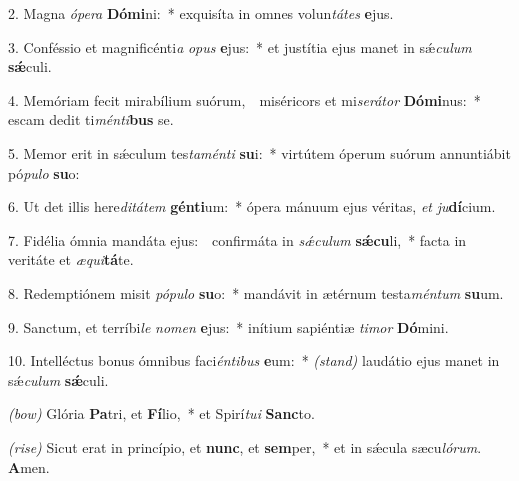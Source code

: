 2. Magna \textit{ó}\textit{pe}\textit{ra} \textbf{Dó}\textbf{mi}ni:~* 
	exquisíta in omnes volun\textit{tá}\textit{tes} \textbf{e}jus.

3. Conféssio et magnificénti\textit{a} \textit{o}\textit{pus} \textbf{e}jus:~* 
	et justítia ejus manet in sǽ\textit{cu}\textit{lum} \textbf{sǽ}culi.

4. Memóriam fecit mirabílium suórum,~{\color{red}\GreDagger}\ miséricors et mi\textit{se}\textit{rá}\textit{tor} \textbf{Dó}\textbf{mi}nus:~* 
	escam dedit ti\textit{mén}\textit{ti}\textbf{bus} se.

5. Memor erit in sǽculum tes\textit{ta}\textit{mén}\textit{ti} \textbf{su}i:~* 
	virtútem óperum suórum annuntiábit pó\textit{pu}\textit{lo} \textbf{su}o:

6. Ut det illis here\textit{di}\textit{tá}\textit{tem} \textbf{gén}\textbf{ti}um:~* 
	ópera mánuum ejus véritas, \textit{et} \textit{ju}\textbf{dí}cium.

7. Fidélia ómnia mandáta ejus:~{\color{red}\GreDagger}\ confirmáta in \textit{sǽ}\textit{cu}\textit{lum} \textbf{sǽ}\textbf{cu}li,~* 
	facta in veritáte et \textit{æ}\textit{qui}\textbf{tá}te.

8. Redemptiónem misit \textit{pó}\textit{pu}\textit{lo} \textbf{su}o:~* 
	mandávit in ætérnum testa\textit{mén}\textit{tum} \textbf{su}um.

9. Sanctum, et terríbi\textit{le} \textit{no}\textit{men} \textbf{e}jus:~* 
	inítium sapiéntiæ \textit{ti}\textit{mor} \textbf{Dó}mini.

10. Intelléctus bonus ómnibus faci\textit{én}\textit{ti}\textit{bus} \textbf{e}um:~* 
	{\color{red}\textit{(stand)}} laudátio ejus manet in sǽ\textit{cu}\textit{lum} \textbf{sǽ}culi.

{\color{red}\textit{(bow)}} Glória \textbf{Pa}tri, et \textbf{Fí}lio,~*
	et Spirí\textit{tu}\textit{i} \textbf{Sanc}to.

{\color{red}\textit{(rise)}} Sicut erat in princípio, et \textbf{nunc}, et \textbf{sem}per,~*
	et in s\'{\ae}cula sæcu\textit{ló}\textit{rum}. \textbf{A}men.